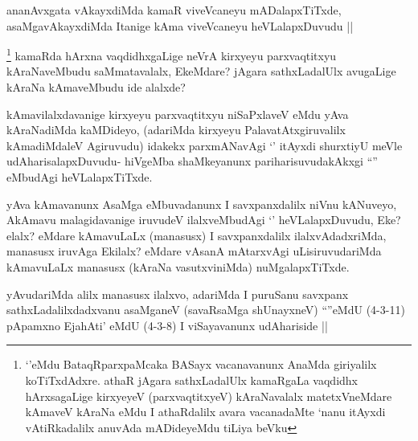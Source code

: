 
\begin{artha}
ananAvxgata vAkayxdiMda kamaR viveVcaneyu mADalapxTiTxde, asaMgavAkayxdiMda Itanige kAma viveVcaneyu heVLalapxDuvudu ||
\end{artha}


\begin{artha}
\footnote{`\stext'eMdu BataqRparxpaMcaka BASayx vacanavanunx AnaMda giriyalilx koTiTxdAdxre. athaR jAgara sathxLadalUlx kamaRgaLa vaqdidhx hArxsagaLige kirxyeyeV (parxvaqtitxyeV) kAraNavalalx matetxVneMdare kAmaveV kAraNa eMdu I athaRdalilx avara vacanadaMte `nanu itAyxdi vAtiRkadalilx anuvAda mADideyeMdu tiLiya beVku}
kamaRda hArxna vaqdidhxgaLige neVrA kirxyeyu parxvaqtitxyu kAraNaveMbudu saMmatavalalx, EkeMdare? jAgara sathxLadalUlx avugaLige kAraNa kAmaveMbudu ide alalxde?
\end{artha}


\begin{artha}
kAmavilalxdavanige kirxyeyu parxvaqtitxyu niSaPxlaveV eMdu yAva kAraNadiMda kaMDideyo, (adariMda kirxyeyu PalavatAtxgiruvalilx kAmadiMdaleV Agiruvudu) idakekx parxmANavAgi `\stext' itAyxdi shurxtiyU meVle udAharisalapxDuvudu- hiVgeMba shaMkeyanunx pariharisuvudakAkxgi ``\stext'' eMbudAgi heVLalapxTiTxde.
\end{artha}


\begin{artha}
yAva kAmavanunx AsaMga eMbuvadanunx I savxpanxdalilx niVnu kANuveyo, AkAmavu malagidavanige iruvudeV ilalxveMbudAgi `\stext' heVLalapxDuvudu, Eke? elalx? eMdare kAmavuLaLx (manasusx) I savxpanxdalilx ilalxvAdadxriMda, manasusx iruvAga Ekilalx? eMdare vAsanA mAtarxvAgi uLisiruvudariMda kAmavuLaLx manasusx (kAraNa vasutxviniMda) nuMgalapxTiTxde.
\end{artha}

\begin{artha}
yAvudariMda alilx manasusx ilalxvo, adariMda I puruSanu savxpanx sathxLadalilxdadxvanu asaMganeV (savaRsaMga shUnayxneV) ``\stext''eMdU (4-3-11) pApamxno Eja{hA}ti' eMdU (4-3-8) I viSayavanunx udAhariside ||
\end{artha}

